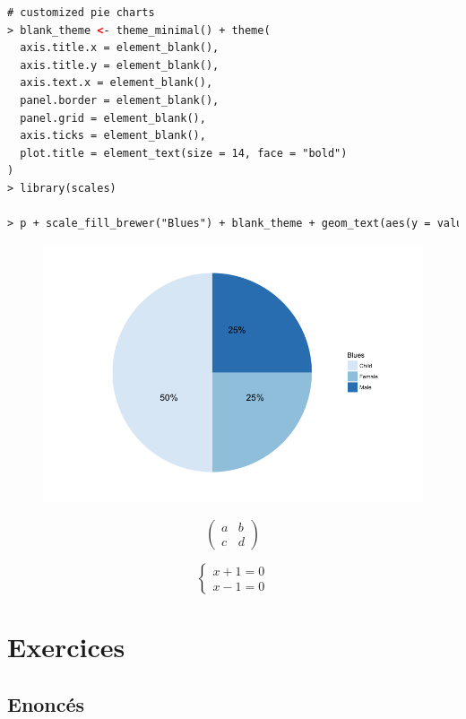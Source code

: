 \begin{lstlisting}[language=html]
# customized pie charts
> blank_theme <- theme_minimal() + theme(
  axis.title.x = element_blank(),
  axis.title.y = element_blank(),
  axis.text.x = element_blank(),
  panel.border = element_blank(),
  panel.grid = element_blank(),
  axis.ticks = element_blank(),
  plot.title = element_text(size = 14, face = "bold")
)
> library(scales)

> p + scale_fill_brewer("Blues") + blank_theme + geom_text(aes(y = value/3 + c(0, cumsum(value)[-length(value)]),label = percent(value/100)), size = 5)
\end{lstlisting}
\begin{figure}[H]\begin{center}\includegraphics[scale=1 ]{ilu/bg139.png}\end{center}\end{figure}






$$\begin{pmatrix}
a & b \\
c & d
\end{pmatrix}$$

$$\left
\{
\begin{array}{c}
x+1=0\\
x-1=0
\end{array}
\right.
$$

\section{Exercices}
\subsection{Enoncés}



